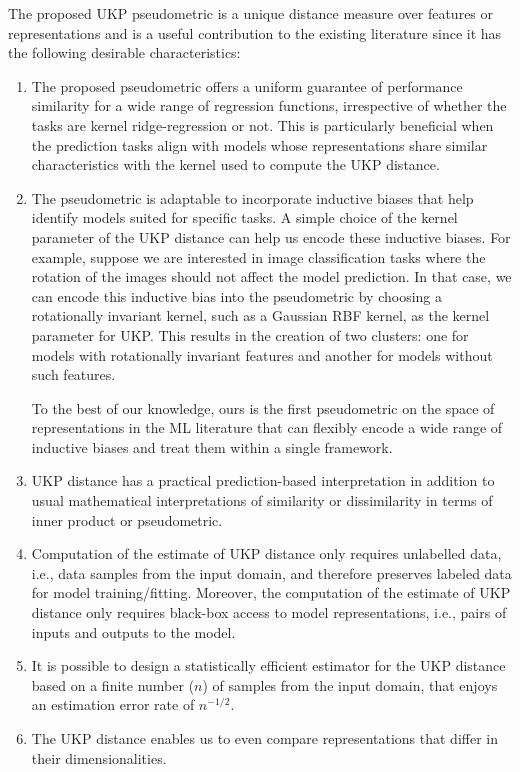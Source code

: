 \documentclass{article}
\theoremstyle{plain}
\newcommand{\metricstname}{UKP }
\begin{document}
 The proposed \metricstname pseudometric is a unique distance measure over features or representations and is a useful contribution to the existing literature since it has the following desirable characteristics:
\begin{enumerate}
    
     \item The proposed pseudometric offers a uniform guarantee of performance similarity for a wide range of regression functions, irrespective of whether the tasks are kernel ridge-regression or not. This is particularly beneficial when the prediction tasks align with models whose representations share similar characteristics with the kernel used to compute the \metricstname distance.

     \item The pseudometric is adaptable to incorporate inductive biases that help identify models suited for specific tasks. A simple choice of the kernel parameter of the \metricstname distance can help us encode these inductive biases. For example, suppose we are interested in image classification tasks where the rotation of the images should not affect the model prediction. In that case, we can encode this inductive bias into the pseudometric by choosing a rotationally invariant kernel, such as a Gaussian RBF kernel, as the kernel parameter for UKP. This results in the creation of two clusters: one for models with rotationally invariant features and another for models without such features.
   
    To the best of our knowledge, ours is the first pseudometric on the space of representations in the ML literature that can flexibly encode a wide range of inductive biases and treat them within a single framework.

    \item \metricstname distance has a practical prediction-based interpretation in addition to usual mathematical interpretations of similarity or dissimilarity in terms of inner product or pseudometric.
   
    \item Computation of the estimate of \metricstname distance only requires unlabelled data, i.e., data samples from the input domain, and therefore preserves labeled data for model training/fitting. Moreover, the computation of the estimate of \metricstname distance only requires black-box access to model representations, i.e., pairs of inputs and outputs to the model. 
    \item It is possible to design a statistically efficient estimator for the \metricstname distance based on a finite number ($n$) of samples from the input domain, that enjoys an estimation error rate of $n^{-1/2}$.
    \item The \metricstname distance enables us to even compare representations that differ in their dimensionalities. 
    
\end{enumerate}
\end{document}
